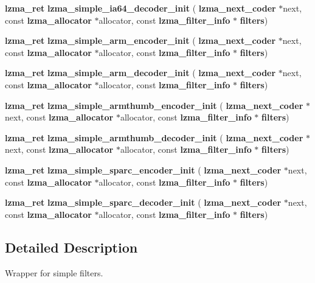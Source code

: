 \begin{DoxyCompactItemize}
\item 
\mbox{\label{simple__coder_8h_a0377d89310e72226e2b38b19c051568d}} 
\textbf{ lzma\+\_\+ret} {\bfseries lzma\+\_\+simple\+\_\+ia64\+\_\+decoder\+\_\+init} (\textbf{ lzma\+\_\+next\+\_\+coder} $\ast$next, const \textbf{ lzma\+\_\+allocator} $\ast$allocator, const \textbf{ lzma\+\_\+filter\+\_\+info} $\ast$\textbf{ filters})
\item 
\mbox{\label{simple__coder_8h_a053f8568d6b448ef988a91a3c8394f76}} 
\textbf{ lzma\+\_\+ret} {\bfseries lzma\+\_\+simple\+\_\+arm\+\_\+encoder\+\_\+init} (\textbf{ lzma\+\_\+next\+\_\+coder} $\ast$next, const \textbf{ lzma\+\_\+allocator} $\ast$allocator, const \textbf{ lzma\+\_\+filter\+\_\+info} $\ast$\textbf{ filters})
\item 
\mbox{\label{simple__coder_8h_a8400313e2702a9f9ea3f4ac752cf0e56}} 
\textbf{ lzma\+\_\+ret} {\bfseries lzma\+\_\+simple\+\_\+arm\+\_\+decoder\+\_\+init} (\textbf{ lzma\+\_\+next\+\_\+coder} $\ast$next, const \textbf{ lzma\+\_\+allocator} $\ast$allocator, const \textbf{ lzma\+\_\+filter\+\_\+info} $\ast$\textbf{ filters})
\item 
\mbox{\label{simple__coder_8h_af0df83ba4f024159ab2c6366fb3380da}} 
\textbf{ lzma\+\_\+ret} {\bfseries lzma\+\_\+simple\+\_\+armthumb\+\_\+encoder\+\_\+init} (\textbf{ lzma\+\_\+next\+\_\+coder} $\ast$next, const \textbf{ lzma\+\_\+allocator} $\ast$allocator, const \textbf{ lzma\+\_\+filter\+\_\+info} $\ast$\textbf{ filters})
\item 
\mbox{\label{simple__coder_8h_a9394d8f92e68fb067ff5ab7224bffb34}} 
\textbf{ lzma\+\_\+ret} {\bfseries lzma\+\_\+simple\+\_\+armthumb\+\_\+decoder\+\_\+init} (\textbf{ lzma\+\_\+next\+\_\+coder} $\ast$next, const \textbf{ lzma\+\_\+allocator} $\ast$allocator, const \textbf{ lzma\+\_\+filter\+\_\+info} $\ast$\textbf{ filters})
\item 
\mbox{\label{simple__coder_8h_a1bcac253d52df521955295ba2b9738a6}} 
\textbf{ lzma\+\_\+ret} {\bfseries lzma\+\_\+simple\+\_\+sparc\+\_\+encoder\+\_\+init} (\textbf{ lzma\+\_\+next\+\_\+coder} $\ast$next, const \textbf{ lzma\+\_\+allocator} $\ast$allocator, const \textbf{ lzma\+\_\+filter\+\_\+info} $\ast$\textbf{ filters})
\item 
\mbox{\label{simple__coder_8h_af4d53e9f1a3120498b661e0c31c56bab}} 
\textbf{ lzma\+\_\+ret} {\bfseries lzma\+\_\+simple\+\_\+sparc\+\_\+decoder\+\_\+init} (\textbf{ lzma\+\_\+next\+\_\+coder} $\ast$next, const \textbf{ lzma\+\_\+allocator} $\ast$allocator, const \textbf{ lzma\+\_\+filter\+\_\+info} $\ast$\textbf{ filters})
\end{DoxyCompactItemize}


\subsection{Detailed Description}
Wrapper for simple filters. 

